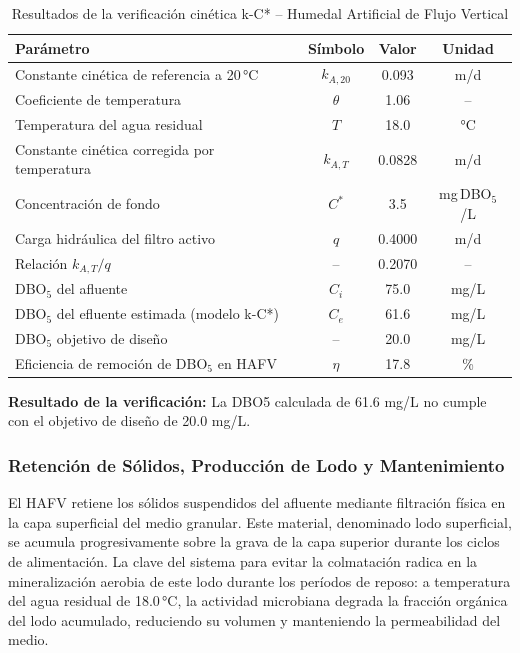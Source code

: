 \documentclass[12pt,a4paper]{article}
\begin{document}
\begin{table}[H]
\centering
\caption{Resultados de la verificación cinética k-C* -- Humedal Artificial de Flujo Vertical}
\label{tab:verificacion_kC}
\begin{tabular}{lccc}
\toprule
\textbf{Parámetro} & \textbf{Símbolo} & \textbf{Valor} & \textbf{Unidad} \\
\midrule
Constante cinética de referencia a 20\,°C & $k_{A,20}$ & 0.093 & m/d \\
Coeficiente de temperatura & $\theta$ & 1.06 & -- \\
Temperatura del agua residual & $T$ & 18.0 & °C \\
Constante cinética corregida por temperatura & $k_{A,T}$ & 0.0828 & m/d \\
Concentración de fondo & $C^*$ & 3.5 & mg\,DBO$_5$/L \\
Carga hidráulica del filtro activo & $q$ & 0.4000 & m/d \\
Relación $k_{A,T} / q$ & -- & 0.2070 & -- \\
DBO$_5$ del afluente & $C_i$ & 75.0 & mg/L \\
DBO$_5$ del efluente estimada (modelo k-C*) & $C_e$ & 61.6 & mg/L \\
DBO$_5$ objetivo de diseño & -- & 20.0 & mg/L \\
Eficiencia de remoción de DBO$_5$ en HAFV & $\eta$ & 17.8 & \% \\
\bottomrule
\end{tabular}
\end{table}

\textbf{Resultado de la verificación:} La DBO5 calculada de 61.6 mg/L no cumple con el objetivo de diseño de 20.0 mg/L.

\subsubsection*{Retención de Sólidos, Producción de Lodo y Mantenimiento}

El HAFV retiene los sólidos suspendidos del afluente mediante filtración física en la capa superficial del medio granular. Este material, denominado lodo superficial, se acumula progresivamente sobre la grava de la capa superior durante los ciclos de alimentación. La clave del sistema para evitar la colmatación radica en la mineralización aerobia de este lodo durante los períodos de reposo: a temperatura del agua residual de 18.0\,°C, la actividad microbiana degrada la fracción orgánica del lodo acumulado, reduciendo su volumen y manteniendo la permeabilidad del medio.
\end{document}

